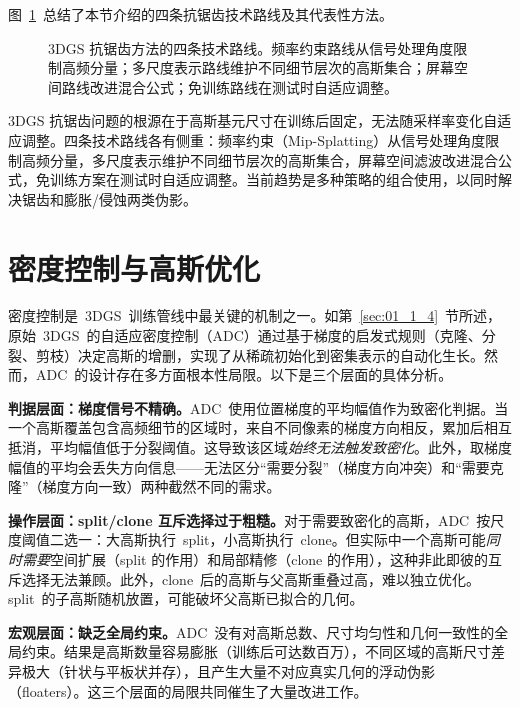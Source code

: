 图~\ref{fig:02_antialiasing}~总结了本节介绍的四条抗锯齿技术路线及其代表性方法。

\begin{figure}[htbp]
\centering
\resizebox{0.9\textwidth}{!}{}
\caption{3DGS 抗锯齿方法的四条技术路线。频率约束路线从信号处理角度限制高频分量；多尺度表示路线维护不同细节层次的高斯集合；屏幕空间路线改进混合公式；免训练路线在测试时自适应调整。}
\label{fig:02_antialiasing}
\end{figure}

\begin{takeaway}
3DGS 抗锯齿问题的根源在于高斯基元尺寸在训练后固定，无法随采样率变化自适应调整。四条技术路线各有侧重：频率约束（Mip-Splatting）从信号处理角度限制高频分量，多尺度表示维护不同细节层次的高斯集合，屏幕空间滤波改进混合公式，免训练方案在测试时自适应调整。当前趋势是多种策略的组合使用，以同时解决锯齿和膨胀/侵蚀两类伪影。
\end{takeaway}



\section{密度控制与高斯优化}
\label{sec:02_2}

密度控制是~3DGS~训练管线中最关键的机制之一。如第~\ref{sec:01_1_4}~节所述，原始~3DGS~的自适应密度控制（ADC）通过基于梯度的启发式规则（克隆、分裂、剪枝）决定高斯的增删，实现了从稀疏初始化到密集表示的自动化生长。然而，ADC~的设计存在多方面根本性局限。以下是三个层面的具体分析。

\textbf{判据层面：梯度信号不精确。}ADC~使用位置梯度的平均幅值作为致密化判据。当一个高斯覆盖包含高频细节的区域时，来自不同像素的梯度方向相反，累加后相互抵消，平均幅值低于分裂阈值。这导致该区域\emph{始终无法触发致密化}。此外，取梯度幅值的平均会丢失方向信息——无法区分“需要分裂”（梯度方向冲突）和“需要克隆”（梯度方向一致）两种截然不同的需求。

\textbf{操作层面：split/clone 互斥选择过于粗糙。}对于需要致密化的高斯，ADC~按尺度阈值二选一：大高斯执行~split，小高斯执行~clone。但实际中一个高斯可能\emph{同时需要}空间扩展（split 的作用）和局部精修（clone 的作用），这种非此即彼的互斥选择无法兼顾。此外，clone~后的高斯与父高斯重叠过高，难以独立优化。split~的子高斯随机放置，可能破坏父高斯已拟合的几何。

\textbf{宏观层面：缺乏全局约束。}ADC~没有对高斯总数、尺寸均匀性和几何一致性的全局约束。结果是高斯数量容易膨胀（训练后可达数百万），不同区域的高斯尺寸差异极大（针状与平板状并存），且产生大量不对应真实几何的浮动伪影（floaters）。这三个层面的局限共同催生了大量改进工作。

